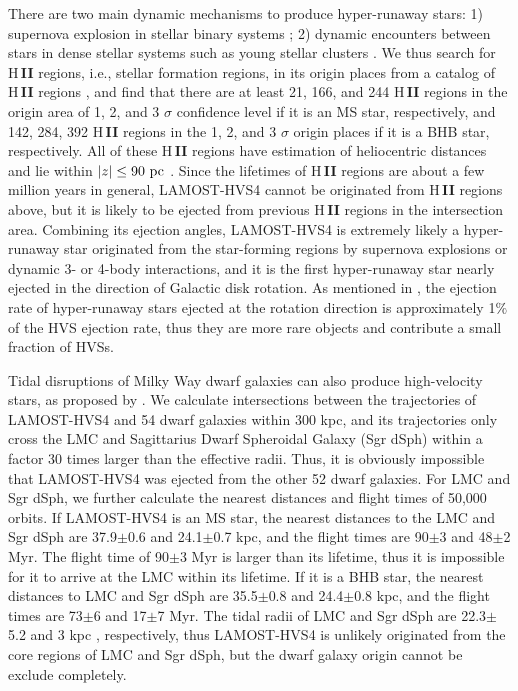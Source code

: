 \documentclass[iop, aj]{emulateapj}
\begin{document}
There are two main dynamic mechanisms to produce hyper-runaway stars: 1) supernova explosion in stellar binary systems \citep{1961BAN....15..265B, 2000ApJ...544..437P}; 2) dynamic encounters between stars in dense stellar systems such as young stellar clusters \citep{1967BOTT....4...86P, 1990AJ.....99..608L, 2009MNRAS.396..570G}. We thus search for H\,{\small \bf II} regions, i.e., stellar formation regions, in its origin places from a catalog of H\,{\small \bf II} regions \citep{2014ApJS..212....1A}, and find that there are at least 21, 166, and 244 H\,{\small \bf II} regions in the origin area of 1, 2, and 3 $\sigma$ confidence level if it is an MS star, respectively, and 142, 284, 392 H\,{\small \bf II} regions in the 1, 2, and 3 $\sigma$ origin places if it is a BHB star, respectively. All of these H\,{\small \bf II} regions have estimation of heliocentric distances and lie within $|z| \leq 90~\rm pc$ \citep{2018submitX}. Since the lifetimes of H\,{\small \bf II} regions are about a few million years in general, LAMOST-HVS4 cannot be originated from H\,{\small \bf II} regions above, but it is likely to be ejected from previous H\,{\small \bf II} regions in the intersection area. Combining its ejection angles, LAMOST-HVS4 is extremely likely a hyper-runaway star originated from the star-forming regions by supernova explosions or dynamic 3- or 4-body interactions, and it is the first hyper-runaway star nearly ejected in the direction of Galactic disk rotation. As mentioned in \citet{2015ARA&A..53...15B}, the ejection rate of hyper-runaway stars ejected at the rotation direction is approximately 1$\%$ of the HVS ejection rate, thus they are more rare objects and contribute a small fraction of HVSs.

Tidal disruptions of Milky Way dwarf galaxies can also produce high-velocity stars, as proposed by \citet{2009ApJ...691L..63A}. We calculate intersections between the trajectories of LAMOST-HVS4 and 54 dwarf galaxies within 300 kpc, and its trajectories only cross the LMC and Sagittarius Dwarf Spheroidal Galaxy (Sgr dSph) within a factor 30 times larger than the effective radii. Thus, it is obviously impossible that LAMOST-HVS4 was ejected from the other 52 dwarf galaxies. For LMC and Sgr dSph, we further calculate the nearest distances and flight times of 50,000 orbits. If LAMOST-HVS4 is an MS star, the nearest distances to the LMC and Sgr dSph are 37.9$\pm$0.6 and 24.1$\pm$0.7 kpc, and the flight times are 90$\pm$3 and 48$\pm$2 Myr. The flight time of 90$\pm$3 Myr is larger than its lifetime, thus it is impossible for it to arrive at the LMC within its lifetime. If it is a BHB star, the nearest distances to LMC and Sgr dSph are 35.5$\pm$0.8 and 24.4$\pm$0.8 kpc, and the flight times are 73$\pm$6 and 17$\pm$7 Myr. The tidal radii of LMC and Sgr dSph are 22.3$\pm$5.2 and 3 kpc \citep{2014ApJ...781..121V, 2001MNRAS.323..529H}, respectively, thus LAMOST-HVS4 is unlikely originated from the core regions of LMC and Sgr dSph, but the dwarf galaxy origin cannot be exclude completely.
\end{document}
